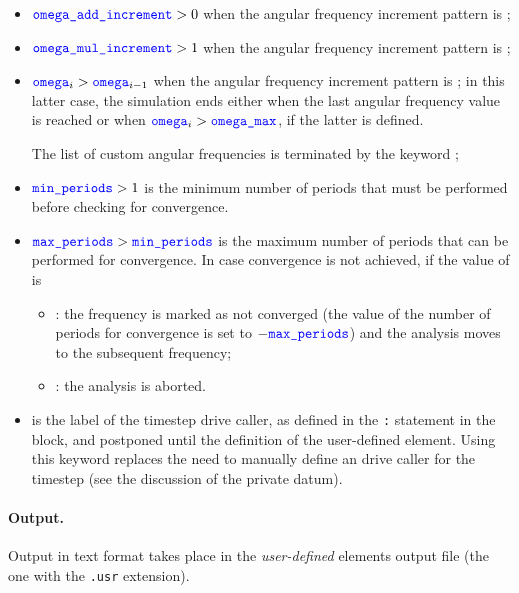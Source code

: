 \begin{itemize}
\item $\textcolor{blue}{\texttt{omega\_add\_increment}} > 0$ when the angular frequency increment pattern is ;

\item $\textcolor{blue}{\texttt{omega\_mul\_increment}} > 1$ when the angular frequency increment pattern is ;

\item $\textcolor{blue}{\texttt{omega}}_i > \textcolor{blue}{\texttt{omega}}_{i-1}$ when the angular frequency increment pattern is ; in this latter case, the simulation ends either when the last angular frequency value is reached or when $\textcolor{blue}{\texttt{omega}}_i > \textcolor{blue}{\texttt{omega\_max}}$, if the latter is defined.

The list of custom angular frequencies is terminated by the keyword ;

\item $\textcolor{blue}{\texttt{min\_periods}} > 1$ is the minimum number of periods that must be performed before checking for convergence.

\item $\textcolor{blue}{\texttt{max\_periods}} > \textcolor{blue}{\texttt{min\_periods}}$ is the maximum number of periods that can be performed for convergence.
In case convergence is not achieved, if the value of  is
\begin{itemize}
\item {}: the frequency is marked as not converged
(the value of the number of periods for convergence is set to $-\textcolor{blue}{\texttt{max\_periods}}$) and the analysis moves to the subsequent frequency;

\item {}: the analysis is aborted.
\end{itemize}

\item {} is the label of the timestep drive caller, as defined in the \texttt{:}  statement in the  block, and postponed until the definition of the user-defined element.
Using this keyword replaces the need to manually define an  drive caller for the timestep
(see the discussion of the  private datum).
\end{itemize}

\paragraph{Output.}
Output in text format takes place in the \emph{user-defined} elements output file (the one with the \texttt{.usr} extension).

